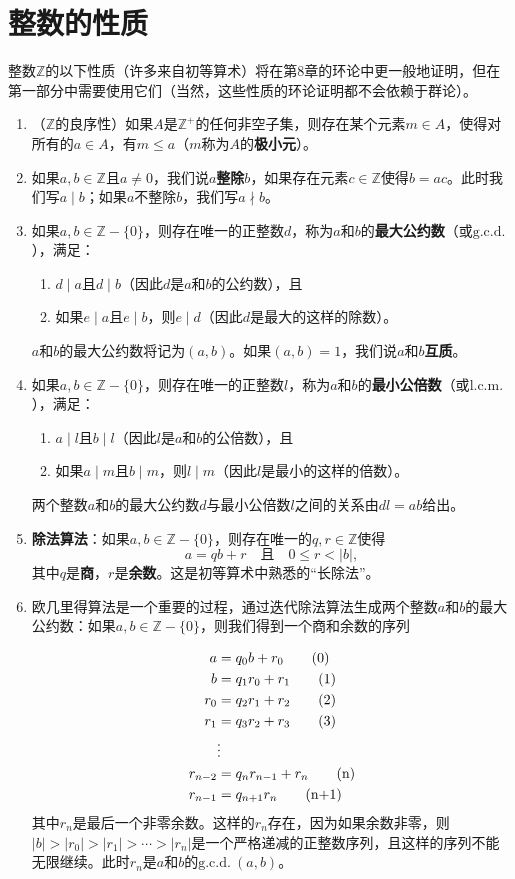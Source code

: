 \section{整数的性质}
整数$\mathbb{Z}$的以下性质（许多来自初等算术）将在第8章的环论中更一般地证明，但在第一部分中需要使用它们（当然，这些性质的环论证明都不会依赖于群论）。

\begin{enumerate}[label=(\arabic*)]
\item （$\mathbb{Z}$的良序性）如果$A$是$\mathbb{Z}^+$的任何非空子集，则存在某个元素$m \in A$，使得对所有的$a \in A$，有$m \leq a$（$m$称为$A$的\textbf{极小元}）。
\item 如果$a, b \in \mathbb{Z}$且$a \neq 0$，我们说$a$\textbf{整除}$b$，如果存在元素$c \in \mathbb{Z}$使得$b = ac$。此时我们写$a \mid b$；如果$a$不整除$b$，我们写$a \nmid b$。
\item 如果$a, b \in \mathbb{Z} - \{0\}$，则存在唯一的正整数$d$，称为$a$和$b$的\textbf{最大公约数}（或$\text{g.c.d.}$），满足：
\begin{enumerate}
\item $d \mid a$且$d \mid b$（因此$d$是$a$和$b$的公约数），且
\item 如果$e \mid a$且$e \mid b$，则$e \mid d$（因此$d$是最大的这样的除数）。
\end{enumerate}
$a$和$b$的最大公约数将记为$(a, b)$。如果$(a, b) = 1$，我们说$a$和$b$\textbf{互质}。
\item 如果$a, b \in \mathbb{Z} - \{0\}$，则存在唯一的正整数$l$，称为$a$和$b$的\textbf{最小公倍数}（或$\text{l.c.m.}$），满足：
\begin{enumerate}
\item $a \mid l$且$b \mid l$（因此$l$是$a$和$b$的公倍数），且
\item 如果$a \mid m$且$b \mid m$，则$l \mid m$（因此$l$是最小的这样的倍数）。
\end{enumerate}
两个整数$a$和$b$的最大公约数$d$与最小公倍数$l$之间的关系由$dl = ab$给出。
\item \textbf{除法算法}：如果$a, b \in \mathbb{Z} - \{0\}$，则存在唯一的$q, r \in \mathbb{Z}$使得
\[a = qb + r\quad \text{且}\quad  0 \leq r < |b|,\]
其中$q$是\textbf{商}，$r$是\textbf{余数}。这是初等算术中熟悉的“长除法”。
\item 欧几里得算法是一个重要的过程，通过迭代除法算法生成两个整数$a$和$b$的最大公约数：如果$a, b \in \mathbb{Z} - \{0\}$，则我们得到一个商和余数的序列

\begin{align}
a &= q_0 b + r_0 \tag{0} \\
b &= q_1 r_0 + r_1 \tag{1} \\
r_0 &= q_2 r_1 + r_2 \tag{2} \\
r_1 &= q_3 r_2 + r_3 \tag{3} \\
&\notag\vdots \\
r_{n-2} &= q_n r_{n-1} + r_n \tag{n} \\
r_{n-1} &= q_{n+1} r_n \tag{n+1}
\end{align}
其中$r_n$是最后一个非零余数。这样的$r_n$存在，因为如果余数非零，则$|b| > |r_0| > |r_1| > \cdots > |r_n|$是一个严格递减的正整数序列，且这样的序列不能无限继续。此时$r_n$是$a$和$b$的$\text{g.c.d.} \ (a, b)$。


\end{enumerate}
